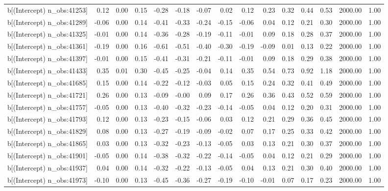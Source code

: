 \begin{table}[ht]
\begin{tabular}{rrrrrrrrrrrrrrr}
  b[(Intercept) n\_obs:41253] & 0.12 & 0.00 & 0.15 & -0.28 & -0.18 & -0.07 & 0.02 & 0.12 & 0.23 & 0.32 & 0.44 & 0.53 & 2000.00 & 1.00 \\ 
  b[(Intercept) n\_obs:41289] & -0.06 & 0.00 & 0.14 & -0.41 & -0.33 & -0.24 & -0.15 & -0.06 & 0.04 & 0.12 & 0.21 & 0.30 & 2000.00 & 1.00 \\ 
  b[(Intercept) n\_obs:41325] & -0.01 & 0.00 & 0.14 & -0.36 & -0.28 & -0.19 & -0.11 & -0.01 & 0.09 & 0.18 & 0.28 & 0.37 & 2000.00 & 1.00 \\ 
  b[(Intercept) n\_obs:41361] & -0.19 & 0.00 & 0.16 & -0.61 & -0.51 & -0.40 & -0.30 & -0.19 & -0.09 & 0.01 & 0.13 & 0.22 & 2000.00 & 1.00 \\ 
  b[(Intercept) n\_obs:41397] & -0.01 & 0.00 & 0.15 & -0.41 & -0.31 & -0.21 & -0.11 & -0.01 & 0.09 & 0.18 & 0.29 & 0.38 & 2000.00 & 1.00 \\ 
  b[(Intercept) n\_obs:41433] & 0.35 & 0.01 & 0.30 & -0.45 & -0.25 & -0.04 & 0.14 & 0.35 & 0.54 & 0.73 & 0.92 & 1.18 & 2000.00 & 1.00 \\ 
  b[(Intercept) n\_obs:41685] & 0.15 & 0.00 & 0.14 & -0.22 & -0.12 & -0.03 & 0.05 & 0.15 & 0.24 & 0.32 & 0.41 & 0.49 & 2000.00 & 1.00 \\ 
  b[(Intercept) n\_obs:41721] & 0.26 & 0.00 & 0.13 & -0.09 & -0.00 & 0.09 & 0.17 & 0.26 & 0.36 & 0.43 & 0.52 & 0.59 & 2000.00 & 1.00 \\ 
  b[(Intercept) n\_obs:41757] & -0.05 & 0.00 & 0.13 & -0.40 & -0.32 & -0.23 & -0.14 & -0.05 & 0.04 & 0.12 & 0.20 & 0.31 & 2000.00 & 1.00 \\ 
  b[(Intercept) n\_obs:41793] & 0.12 & 0.00 & 0.13 & -0.23 & -0.15 & -0.06 & 0.03 & 0.12 & 0.21 & 0.29 & 0.36 & 0.45 & 2000.00 & 1.00 \\ 
  b[(Intercept) n\_obs:41829] & 0.08 & 0.00 & 0.13 & -0.27 & -0.19 & -0.09 & -0.02 & 0.07 & 0.17 & 0.25 & 0.33 & 0.42 & 2000.00 & 1.00 \\ 
  b[(Intercept) n\_obs:41865] & 0.03 & 0.00 & 0.13 & -0.32 & -0.23 & -0.13 & -0.05 & 0.03 & 0.13 & 0.21 & 0.30 & 0.37 & 2000.00 & 1.00 \\ 
  b[(Intercept) n\_obs:41901] & -0.05 & 0.00 & 0.14 & -0.38 & -0.32 & -0.22 & -0.14 & -0.05 & 0.04 & 0.12 & 0.21 & 0.29 & 2000.00 & 1.00 \\ 
  b[(Intercept) n\_obs:41937] & 0.04 & 0.00 & 0.14 & -0.32 & -0.22 & -0.13 & -0.05 & 0.04 & 0.13 & 0.21 & 0.30 & 0.40 & 2000.00 & 1.00 \\ 
  b[(Intercept) n\_obs:41973] & -0.10 & 0.00 & 0.13 & -0.45 & -0.36 & -0.27 & -0.19 & -0.10 & -0.01 & 0.07 & 0.17 & 0.23 & 2000.00 & 1.00 \\ 

\end{tabular}
\end{table}
